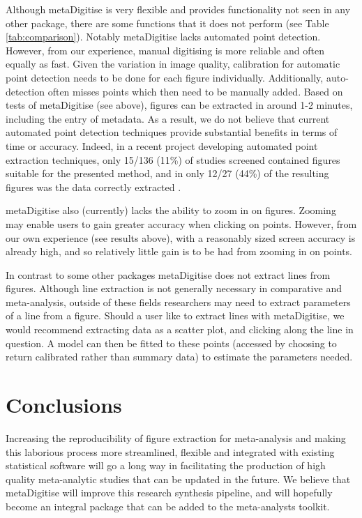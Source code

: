 \documentclass[12pt]{article}
\newcommand{\pkg}[1]{{\fontseries{b}\selectfont #1}}
\begin{document}
Although \pkg{metaDigitise} is very flexible and provides functionality not seen in any other package, there are some functions that it does not perform (see Table \ref{tab:comparison}). Notably \pkg{metaDigitise} lacks automated point detection. However, from our experience, manual digitising is more reliable and often equally as fast. Given the variation in image quality, calibration for automatic point detection needs to be done for each figure individually. Additionally, auto-detection often misses points which then need to be manually added. Based on tests of \pkg{metaDigitise} (see above), figures can be extracted in around 1-2 minutes, including the entry of metadata. As a result, we do not believe that current automated point detection techniques provide substantial benefits in terms of time or accuracy. 
Indeed, in a recent project developing automated point extraction techniques, only 15/136 (11\%) of studies screened contained figures suitable for the presented method, and in only 12/27 (44\%) of the resulting figures was the data correctly extracted \citep{Hartgerink2017}.

\pkg{metaDigitise} also (currently) lacks the ability to zoom in on figures. Zooming may enable users to gain greater accuracy when clicking on points. However, from our own experience (see results above), with a reasonably sized screen accuracy is already high, and so relatively little gain is to be had from zooming in on points.

In contrast to some other packages \pkg{metaDigitise} does not extract lines from figures. Although line extraction is not generally necessary in comparative and meta-analysis, outside of these fields researchers may need to extract parameters of a line from a figure. Should a user like to extract lines with \pkg{metaDigitise}, we would recommend extracting data as a scatter plot, and clicking along the line in question. A model can then be fitted to these points (accessed by choosing to return calibrated rather than summary data) to estimate the parameters needed.





\section{Conclusions}
Increasing the reproducibility of figure extraction for meta-analysis and making this laborious process more streamlined, flexible and integrated with existing statistical software will go a long way in facilitating the production of high quality meta-analytic studies that can be updated in the future. We believe that \pkg{metaDigitise} will improve this research synthesis pipeline, and will hopefully become an integral package that can be added to the meta-analysts toolkit.
\end{document}
